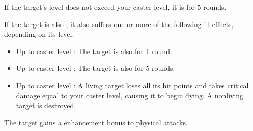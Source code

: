 \begin{spellheader}
\end{spellheader}
\begin{spellcontent}
    \begin{spelltargetinginfo}
    \end{spelltargetinginfo}
    \begin{spelleffects}
        \spelleffect If the target's level does not exceed your caster level, it is \sickened for 5 rounds.

        If the target is also \bloodied, it also suffers one or more of the following ill effects, depending on its level.
        \begin{itemize}
            \item Up to caster level : The target is also \nauseated for 1 round.
            \item Up to caster level : The target is also \paralyzed for 5 rounds.
            \item Up to caster level : A living target loses all its hit points and takes critical damage equal to your caster level, causing it to begin dying. A nonliving target is destroyed.
        \end{itemize}
    \end{spelleffects}
\end{spellcontent}
\begin{spellfooter}

\end{spellfooter}

\begin{spellheader}
\end{spellheader}
\begin{spellcontent}
    \begin{spelltargetinginfo}
    \end{spelltargetinginfo}
    \begin{spelleffects}
        \spelleffect The target gains a  enhancement bonus to physical attacks. \spellbonusscalingdescription
    \end{spelleffects}
\end{spellcontent}
\begin{spellfooter}

\end{spellfooter}

